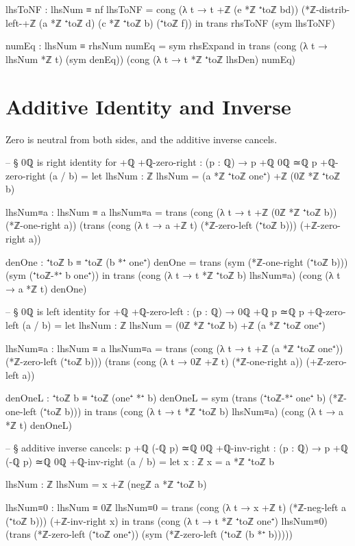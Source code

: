 \documentclass[11pt,a4paper]{book}
\begin{document}
\begin{code}
        lhsToNF : lhsNum ≡ nf
        lhsToNF =
          cong (λ t → t +ℤ (e *ℤ ⁺toℤ bd))
            (*ℤ-distrib-left-+ℤ (a *ℤ ⁺toℤ d) (c *ℤ ⁺toℤ b) (⁺toℤ f))
      in
      trans rhsToNF (sym lhsToNF)

    numEq : lhsNum ≡ rhsNum
    numEq = sym rhsExpand
  in
  trans
    (cong (λ t → lhsNum *ℤ t) (sym denEq))
    (cong (λ t → t *ℤ ⁺toℤ lhsDen) numEq)
\end{code}

\section{Additive Identity and Inverse}

Zero is neutral from both sides, and the additive inverse cancels.

\begin{code}
-- § 0ℚ is right identity for +ℚ
+ℚ-zero-right : (p : ℚ) → p +ℚ 0ℚ ≃ℚ p
+ℚ-zero-right (a / b) =
  let
    lhsNum : ℤ
    lhsNum = (a *ℤ ⁺toℤ one⁺) +ℤ (0ℤ *ℤ ⁺toℤ b)

    lhsNum≡a : lhsNum ≡ a
    lhsNum≡a =
      trans
        (cong (λ t → t +ℤ (0ℤ *ℤ ⁺toℤ b)) (*ℤ-one-right a))
        (trans
          (cong (λ t → a +ℤ t) (*ℤ-zero-left (⁺toℤ b)))
          (+ℤ-zero-right a))

    denOne : ⁺toℤ b ≡ ⁺toℤ (b *⁺ one⁺)
    denOne =
      trans
        (sym (*ℤ-one-right (⁺toℤ b)))
        (sym (⁺toℤ-*⁺ b one⁺))
  in
  trans
    (cong (λ t → t *ℤ ⁺toℤ b) lhsNum≡a)
    (cong (λ t → a *ℤ t) denOne)

-- § 0ℚ is left identity for +ℚ
+ℚ-zero-left : (p : ℚ) → 0ℚ +ℚ p ≃ℚ p
+ℚ-zero-left (a / b) =
  let
    lhsNum : ℤ
    lhsNum = (0ℤ *ℤ ⁺toℤ b) +ℤ (a *ℤ ⁺toℤ one⁺)

    lhsNum≡a : lhsNum ≡ a
    lhsNum≡a =
      trans
        (cong (λ t → t +ℤ (a *ℤ ⁺toℤ one⁺)) (*ℤ-zero-left (⁺toℤ b)))
        (trans
          (cong (λ t → 0ℤ +ℤ t) (*ℤ-one-right a))
          (+ℤ-zero-left a))

    denOneL : ⁺toℤ b ≡ ⁺toℤ (one⁺ *⁺ b)
    denOneL = sym (trans (⁺toℤ-*⁺ one⁺ b) (*ℤ-one-left (⁺toℤ b)))
  in
  trans
    (cong (λ t → t *ℤ ⁺toℤ b) lhsNum≡a)
    (cong (λ t → a *ℤ t) denOneL)

-- § additive inverse cancels: p +ℚ (-ℚ p) ≃ℚ 0ℚ
+ℚ-inv-right : (p : ℚ) → p +ℚ (-ℚ p) ≃ℚ 0ℚ
+ℚ-inv-right (a / b) =
  let
    x : ℤ
    x = a *ℤ ⁺toℤ b

    lhsNum : ℤ
    lhsNum = x +ℤ (negℤ a *ℤ ⁺toℤ b)

    lhsNum≡0 : lhsNum ≡ 0ℤ
    lhsNum≡0 =
      trans
        (cong (λ t → x +ℤ t) (*ℤ-neg-left a (⁺toℤ b)))
        (+ℤ-inv-right x)
  in
  trans
    (cong (λ t → t *ℤ ⁺toℤ one⁺) lhsNum≡0)
    (trans
      (*ℤ-zero-left (⁺toℤ one⁺))
      (sym (*ℤ-zero-left (⁺toℤ (b *⁺ b)))))
\end{code}
\end{document}
